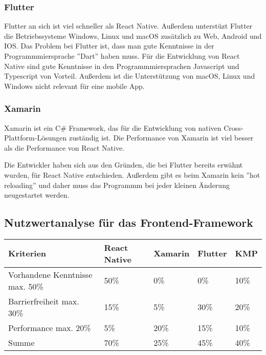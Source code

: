 \subsubsection{Flutter}

Flutter an sich ist viel schneller als React Native.
Außerdem unterstüzt Flutter die Betriebssysteme  Windows, Linux und macOS zusätzlich zu Web, Android und IOS.
\cite{flutter-vs-react-native}
\newline
Das Problem bei Flutter ist, dass man gute Kenntnisse in der Programmmiersprache ''Dart'' haben muss. \cite{flutter-vs-react-native}
Für die Entwicklung von React Native sind gute Kenntnisse in den Programmmiersprachen Javascript und Typescript von Vorteil.
Außerdem ist die Unterstützung von macOS, Linux und Windows nicht relevant für eine mobile App.


\subsubsection{Xamarin}

Xamarin ist ein C\# Framework, das für die Entwicklung von nativen Cross-Plattform-Lösungen zuständig ist.
Die Performance von Xamarin ist viel besser als die Performance von React Native. \cite{xamarin-vs-react-native}

Die Entwickler haben sich aus den Gründen, die bei Flutter bereits erwähnt wurden, für React Native entschieden.
Außerdem gibt es beim Xamarin kein ''hot reloading'' und daher muss das
Programmm bei jeder kleinen Änderung neugestartet werden.\cite{xamarin-vs-react-native}



\subsection{Nutzwertanalyse für das Frontend-Framework}
\begin{tabular}{|p{5cm} | p{2cm} | p{2cm} | p{2cm} | p{2cm} | }
    \hline
    Kriterien                       & React Native & Xamarin & Flutter & KMP  \\
    \hline
    Vorhandene Kenntnisse max. 50\% & 50\%         & 0\%     & 0\%     & 10\% \\
    \hline
    Barrierfreiheit max. 30\%       & 15\%         & 5\%     & 30\%    & 20\% \\
    \hline
    Performance max. 20\%           & 5\%          & 20\%    & 15\%    & 10\% \\
    \hline
    Summe                           & 70\%         & 25\%    & 45\%    & 40\% \\
    \hline
\end{tabular}





